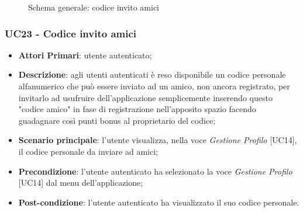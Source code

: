 \begin{figure}[h]
	\centering
	\caption{Schema generale: codice invito amici}
\end{figure}
\subsubsection{UC23 - Codice invito amici}
\begin{itemize}
	\item \textbf{Attori Primari}: utente autenticato;
	\item \textbf{Descrizione}: agli utenti autenticati è reso disponibile un codice personale alfanumerico che può essere inviato ad un amico, non ancora registrato, per invitarlo ad usufruire dell'applicazione semplicemente inserendo questo "codice amico" in fase di registrazione nell'apposito spazio facendo guadagnare così punti bonus al proprietario del codice;
	\item \textbf{Scenario principale}: l'utente visualizza, nella voce \textit{Gestione Profilo} [UC14], il codice personale da inviare ad amici;
	\item \textbf{Precondizione}: l'utente autenticato ha selezionato la voce \textit{Gestione Profilo} [UC14] dal menu dell'applicazione;
	\item \textbf{Post-condizione}: l'utente autenticato ha visualizzato il suo codice personale. 
\end{itemize} 
